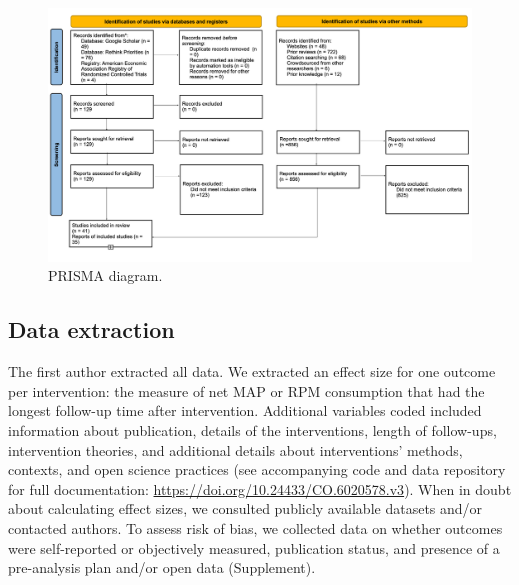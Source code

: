 \documentclass[preprint, 3p,
authoryear]{elsarticle} %
\begin{document}
\begin{figure}[H]

{\centering \includegraphics[width=1.2\linewidth,]{./figures/prisma-diagram} 

}

\caption{PRISMA diagram.}\label{fig:prisma_diagram}
\end{figure}

\subsection{Data extraction}\label{sec2.3}

The first author extracted all data. We extracted an effect size for one
outcome per intervention: the measure of net MAP or RPM consumption that
had the longest follow-up time after intervention. Additional variables
coded included information about publication, details of the
interventions, length of follow-ups, intervention theories, and
additional details about interventions' methods, contexts, and open
science practices (see accompanying code and data repository for full
documentation: \url{https://doi.org/10.24433/CO.6020578.v3}). When in
doubt about calculating effect sizes, we consulted publicly available
datasets and/or contacted authors. To assess risk of bias, we collected
data on whether outcomes were self-reported or objectively measured,
publication status, and presence of a pre-analysis plan and/or open data
(Supplement).
\end{document}

